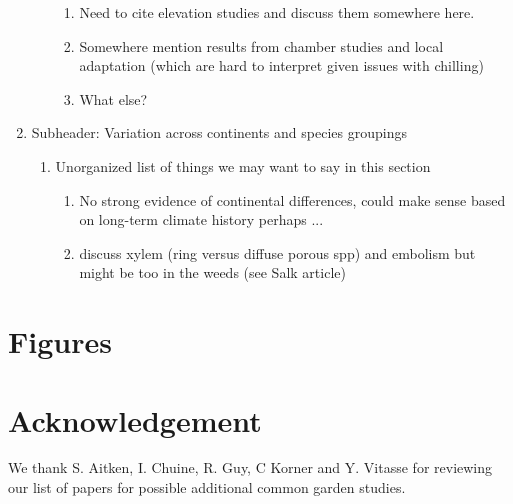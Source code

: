 \documentclass{article}
\begin{document}
\begin{enumerate}
\begin{enumerate}
\begin{enumerate}
  \item Need to cite elevation studies and discuss them somewhere here.
  \item Somewhere mention results from chamber studies and local adaptation (which are hard to interpret given issues with chilling) 
 \item What else?
 \end{enumerate}
  \end{enumerate}
 \item Subheader: Variation across continents and species groupings
 \begin{enumerate}
 \item  Unorganized list of things we may want to say in this section
 \begin{enumerate}
 \item No strong evidence of continental differences, could make sense based on long-term climate history perhaps ... 
\item discuss xylem (ring versus diffuse porous spp) and embolism but might be too in the weeds (see Salk article)
 \end{enumerate}
 \end{enumerate}
\end{enumerate}







\section{Figures}







\section{Acknowledgement}
We thank S. Aitken,  I. Chuine, R. Guy, C Korner and Y. Vitasse for reviewing our list of papers for possible additional common garden studies. 
\end{document}
